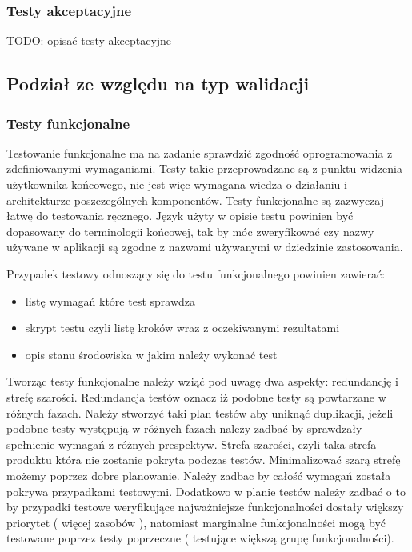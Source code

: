 \subsubsection{Testy akceptacyjne}
TODO: opisać testy akceptacyjne


\subsection{Podział ze względu na typ walidacji}
\subsubsection{Testy funkcjonalne}
Testowanie funkcjonalne ma na zadanie sprawdzić zgodność oprogramowania z zdefiniowanymi wymaganiami. Testy takie przeprowadzane są z punktu widzenia użytkownika końcowego, nie jest więc wymagana wiedza o działaniu i architekturze poszczególnych komponentów. Testy funkcjonalne są  zazwyczaj łatwę do testowania ręcznego. Język użyty w opisie testu powinien być dopasowany do terminologii końcowej, tak by móc zweryfikować czy nazwy używane w aplikacji są zgodne z nazwami używanymi w dziedzinie zastosowania.

Przypadek testowy odnoszący się do testu funkcjonalnego powinien zawierać:
\begin{itemize}
  \item  listę wymagań które test sprawdza
  \item skrypt testu czyli listę kroków wraz z oczekiwanymi rezultatami
  \item opis stanu środowiska w jakim należy wykonać test
\end{itemize}

Tworząc testy funkcjonalne należy wziąć pod uwagę dwa aspekty: redundancję i strefę szarości. Redundancja testów oznacz iż podobne testy są powtarzane w różnych fazach. Należy stworzyć taki plan testów aby uniknąć duplikacji, jeżeli podobne testy występują w różnych fazach należy zadbać by sprawdzały spełnienie wymagań z różnych prespektyw. Strefa szarości, czyli taka strefa produktu która nie zostanie pokryta podczas testów. Minimalizować szarą strefę możemy poprzez dobre planowanie. Należy zadbac by całość wymagań została pokrywa przypadkami testowymi. Dodatkowo w planie testów należy zadbać o to by przypadki testowe weryfikujące najważniejsze funkcjonalności dostały większy priorytet ( więcej zasobów ), natomiast marginalne funkcjonalności mogą być testowane poprzez testy poprzeczne ( testujące większą grupę funkcjonalności).
